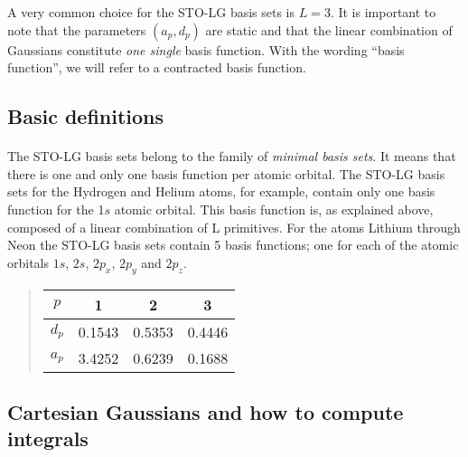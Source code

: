 \documentclass[%
twoside,                 %
final,                   %
10pt]{article}
\begin{document}
A very common choice for the STO-LG basis sets is $L=3$. 
It is important to note that the parameters $(a_p,d_p)$ are static and that the linear combination of Gaussians constitute \emph{one single}
basis function. With the wording ``basis function'', we  will refer to a contracted basis function.



\subsection*{Basic definitions}

\paragraph{}

The STO-LG basis sets belong to the family of \emph{minimal basis sets}.
It means that there is one and only one basis function per atomic orbital.
The STO-LG basis sets for the Hydrogen and Helium atoms, for example, contain only one basis
function for the 1$s$ atomic orbital. This basis function is, as explained above, composed of
a linear combination of L primitives. For the atoms Lithium through Neon the STO-LG basis
sets contain 5 basis functions; one for each of the atomic orbitals
$1s$, $2s$, $2p_x$, $2p_y$ and $2p_z$.



\begin{quote}
\begin{tabular}{cccc}
\hline
\multicolumn{1}{c}{ $p$ } & \multicolumn{1}{c}{ 1 } & \multicolumn{1}{c}{ 2 } & \multicolumn{1}{c}{ 3 } \\
\hline
$d_p$ & 0.1543 & 0.5353 & 0.4446 \\
$a_p$ & 3.4252 & 0.6239 & 0.1688 \\
\hline
\end{tabular}
\end{quote}

\noindent



\subsection*{Cartesian Gaussians and how to compute integrals}

\paragraph{}
\end{document}
